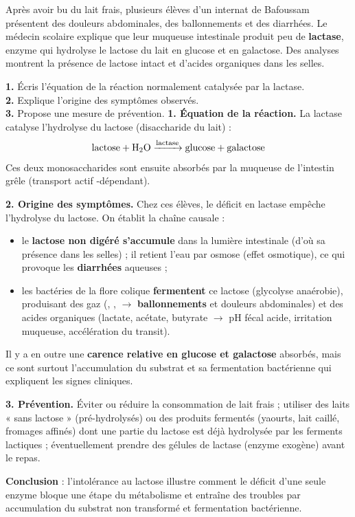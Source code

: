 \documentclass[11pt]{article}
\begin{document}
\begin{exoresolu}
Après avoir bu du lait frais, plusieurs élèves d'un internat de Bafoussam présentent des douleurs abdominales, des ballonnements et des diarrhées. Le médecin scolaire explique que leur muqueuse intestinale produit peu de \textbf{lactase}, enzyme qui hydrolyse le lactose du lait en glucose et en galactose. Des analyses montrent la présence de lactose intact et d'acides organiques dans les selles.

\textbf{1.} Écris l'équation de la réaction normalement catalysée par la lactase.\\
\textbf{2.} Explique l'origine des symptômes observés.\\
\textbf{3.} Propose une mesure de prévention.
\tcblower
\textbf{1. Équation de la réaction.} La lactase catalyse l'hydrolyse du lactose (disaccharide du lait) :
\[ \text{lactose} + \ce{H2O} \xrightarrow{\text{lactase}} \text{glucose} + \text{galactose} \]
Ces deux monosaccharides sont ensuite absorbés par la muqueuse de l'intestin grêle (transport actif -dépendant).

\textbf{2. Origine des symptômes.} Chez ces élèves, le déficit en lactase empêche l'hydrolyse du lactose. On établit la chaîne causale :
\begin{itemize}
\item le \textbf{lactose non digéré s'accumule} dans la lumière intestinale (d'où sa présence dans les selles) ; il retient l'eau par osmose (effet osmotique), ce qui provoque les \textbf{diarrhées} aqueuses ;
\item les bactéries de la flore colique \textbf{fermentent} ce lactose (glycolyse anaérobie), produisant des gaz (, ,  $\rightarrow$ \textbf{ballonnements} et douleurs abdominales) et des acides organiques (lactate, acétate, butyrate $\rightarrow$ pH fécal acide, irritation muqueuse, accélération du transit).
\end{itemize}
Il y a en outre une \textbf{carence relative en glucose et galactose} absorbés, mais ce sont surtout l'accumulation du substrat et sa fermentation bactérienne qui expliquent les signes cliniques.

\textbf{3. Prévention.} Éviter ou réduire la consommation de lait frais ; utiliser des laits « sans lactose » (pré-hydrolysés) ou des produits fermentés (yaourts, lait caillé, fromages affinés) dont une partie du lactose est déjà hydrolysée par les ferments lactiques ; éventuellement prendre des gélules de lactase (enzyme exogène) avant le repas.

\textbf{Conclusion} : l'intolérance au lactose illustre comment le déficit d'une seule enzyme bloque une étape du métabolisme et entraîne des troubles par accumulation du substrat non transformé et fermentation bactérienne.
\end{exoresolu}
\end{document}
